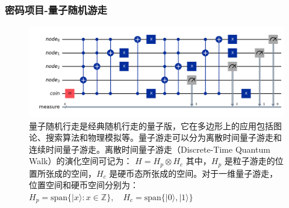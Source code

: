 \documentclass[aspectratio=1610]{beamer}
\begin{document}
\begin{frame}
    \frametitle{密码项目-量子随机游走}
    \begin{figure}[htbp]
        \includegraphics[width=.8\textwidth]{qw.png}
        \caption{量子随机行走是经典随机行走的量子版，它在多边形上的应用包括图论、搜索算法和物理模拟等。量子游走可以分为离散时间量子游走和连续时间量子游走。离散时间量子游走（Discrete-Time Quantum Walk）的演化空间可记为：
        \(
        H = H_p \otimes H_c
        \)
        其中，\( H_p \) 是粒子游走的位置所张成的空间，\( H_c \) 是硬币态所张成的空间。对于一维量子游走，位置空间和硬币空间分别为：
        \(
        H_p = \text{span}\{ |x\rangle : x \in \mathbb{Z} \}, \quad H_c = \text{span}\{ |0\rangle, |1\rangle \}
        \)}
    \end{figure}
\end{frame}

\end{document}
